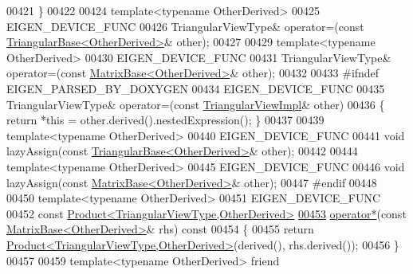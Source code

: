\begin{DoxyCode}
00421     \}
00422 
00424     \textcolor{keyword}{template}<\textcolor{keyword}{typename} OtherDerived>
00425     EIGEN\_DEVICE\_FUNC
00426     TriangularViewType& operator=(\textcolor{keyword}{const} \hyperlink{group___core___module_class_eigen_1_1_triangular_base}{TriangularBase<OtherDerived>}& other);
00427 
00429     \textcolor{keyword}{template}<\textcolor{keyword}{typename} OtherDerived>
00430     EIGEN\_DEVICE\_FUNC
00431     TriangularViewType& operator=(\textcolor{keyword}{const} \hyperlink{group___core___module_class_eigen_1_1_matrix_base}{MatrixBase<OtherDerived>}& other);
00432 
00433 \textcolor{preprocessor}{#ifndef EIGEN\_PARSED\_BY\_DOXYGEN}
00434     EIGEN\_DEVICE\_FUNC
00435     TriangularViewType& operator=(\textcolor{keyword}{const} \hyperlink{class_eigen_1_1_triangular_view_impl}{TriangularViewImpl}& other)
00436     \{ \textcolor{keywordflow}{return} *\textcolor{keyword}{this} = other.derived().nestedExpression(); \}
00437 
00439     \textcolor{keyword}{template}<\textcolor{keyword}{typename} OtherDerived>
00440     EIGEN\_DEVICE\_FUNC
00441     \textcolor{keywordtype}{void} lazyAssign(\textcolor{keyword}{const} \hyperlink{group___core___module_class_eigen_1_1_triangular_base}{TriangularBase<OtherDerived>}& other);
00442 
00444     \textcolor{keyword}{template}<\textcolor{keyword}{typename} OtherDerived>
00445     EIGEN\_DEVICE\_FUNC
00446     \textcolor{keywordtype}{void} lazyAssign(\textcolor{keyword}{const} \hyperlink{group___core___module_class_eigen_1_1_matrix_base}{MatrixBase<OtherDerived>}& other);
00447 \textcolor{preprocessor}{#endif}
00448 
00450     \textcolor{keyword}{template}<\textcolor{keyword}{typename} OtherDerived>
00451     EIGEN\_DEVICE\_FUNC
00452     \textcolor{keyword}{const} \hyperlink{group___core___module_class_eigen_1_1_product}{Product<TriangularViewType,OtherDerived>}
\hyperlink{group___core___module_a1e5b71b779607d4109ade17187a31b82}{00453}     \hyperlink{group___core___module_a1e5b71b779607d4109ade17187a31b82}{operator*}(\textcolor{keyword}{const} \hyperlink{group___core___module_class_eigen_1_1_matrix_base}{MatrixBase<OtherDerived>}& rhs)\textcolor{keyword}{ const}
00454 \textcolor{keyword}{    }\{
00455       \textcolor{keywordflow}{return} \hyperlink{group___core___module_class_eigen_1_1_product}{Product<TriangularViewType,OtherDerived>}(derived(), 
      rhs.derived());
00456     \}
00457 
00459     \textcolor{keyword}{template}<\textcolor{keyword}{typename} OtherDerived> \textcolor{keyword}{friend}

\end{DoxyCode}
